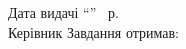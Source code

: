 \begin{center}
\begin{flushleft}
        Дата видачі ``\underline{\hspace{1cm}}'' \underline{\hspace{3cm}} \thesisyear~р.\\
        Керівник \underline{\hspace{5cm}} Завдання отримав: \underline{\hspace{3cm}}
    \end{flushleft}
\end{center}
\newpage
